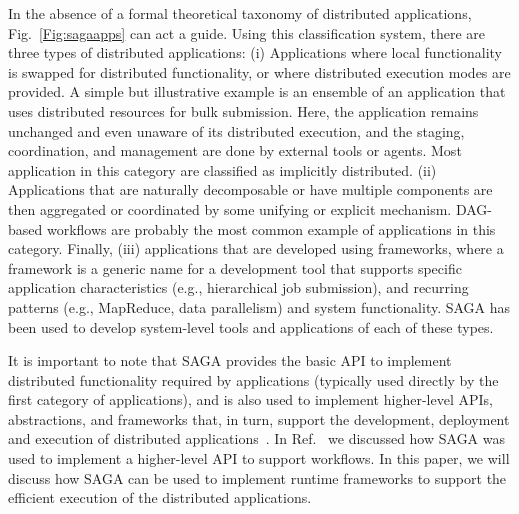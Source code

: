 \documentclass{rspublic}
\begin{document}
In the absence of a formal theoretical taxonomy of distributed
applications, Fig.~\ref{Fig:sagaapps} can act a guide.  Using this
classification system, there are three types of distributed
applications: (i) Applications where local functionality is swapped
for distributed functionality, or where distributed execution modes
are provided.  A simple but illustrative example is an ensemble of an
application that uses distributed resources for bulk submission. Here,
the application remains unchanged and even unaware of its distributed
execution, and the staging, coordination, and management are done by
external tools or agents. Most application in this category are
classified as implicitly distributed.  (ii) Applications that are
naturally decomposable or have multiple components are then aggregated
or coordinated by some unifying or explicit mechanism.  DAG-based
workflows are probably the most common example of applications in this
category.
Finally, (iii) applications that are developed using frameworks, where
a framework is a generic name for a development tool that supports
specific application characteristics (e.g., hierarchical job
submission), and recurring patterns (e.g., MapReduce, data
parallelism) and system functionality.  SAGA has been used to develop
system-level tools and applications of each of these types.



It is important to note that SAGA provides the basic API to implement
distributed functionality required by applications (typically used
directly by the first category of applications), and is also used to
implement higher-level APIs, abstractions, and frameworks that, in
turn, support the development, deployment and execution of distributed
applications~\cite{enkf-gmac09}. In Ref.~\cite{sagamontage09} we
discussed how SAGA was used to implement a higher-level API to support
workflows. In this paper, we will discuss how SAGA can be used to
implement runtime frameworks to support the efficient execution of the
distributed applications.
\end{document}
